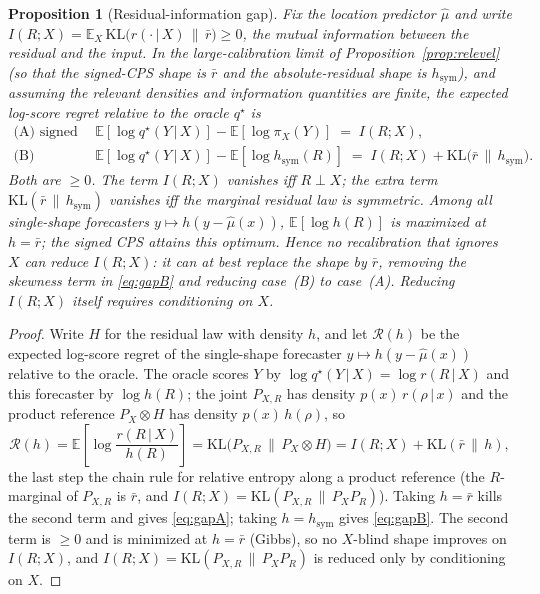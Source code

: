 \documentclass[11pt]{article}
\newtheorem{proposition}{Proposition}
\theoremstyle{definition}
\newcommand{\E}{\mathbb{E}}
\newcommand{\KL}{\mathrm{KL}}
\newcommand{\given}{\,\vert\,}
\begin{document}
\begin{proposition}[Residual-information gap]\label{prop:gap}
Fix the location predictor $\hat\mu$ and write
$I(R;X)=\E_X\,\KL\!\big(r(\cdot\given X)\,\|\,\bar r\big)\ge 0$, the mutual information
between the residual and the input. In the large-calibration limit of
Proposition~\ref{prop:relevel} (so that the signed-CPS shape is $\bar r$ and the
absolute-residual shape is $h_{\mathrm{sym}}$), and assuming the relevant densities and
information quantities are finite, the expected log-score regret relative to the oracle
$q^\star$ is
\begin{align}
  \text{(A) signed CPS:}\quad
  &\E[\log q^\star(Y\given X)]-\E[\log \pi_X(Y)] \;=\; I(R;X), \label{eq:gapA}\\[2pt]
  \text{(B) absolute intervals:}\quad
  &\E[\log q^\star(Y\given X)]-\E[\log h_{\mathrm{sym}}(R)] \;=\; I(R;X)
     +\KL\!\big(\bar r\,\|\,h_{\mathrm{sym}}\big). \label{eq:gapB}
\end{align}
Both are $\ge 0$. The term $I(R;X)$ vanishes iff $R\perp X$; the extra term
$\KL(\bar r\,\|\,h_{\mathrm{sym}})$ vanishes iff the marginal residual law is symmetric.
Among all single-shape forecasters $y\mapsto h(y-\hat\mu(x))$, $\E[\log h(R)]$ is maximized
at $h=\bar r$; the signed CPS attains this optimum. Hence no recalibration that ignores
$X$ can reduce $I(R;X)$: it can at best replace the shape by $\bar r$, removing the
skewness term in \eqref{eq:gapB} and reducing case~(B) to case~(A). Reducing $I(R;X)$
itself requires conditioning on $X$.
\end{proposition}

\begin{proof}
Write $H$ for the residual law with density $h$, and let $\mathcal{R}(h)$ be the expected log-score
regret of the single-shape forecaster $y\mapsto h(y-\hat\mu(x))$ relative to the oracle. The
oracle scores $Y$ by $\log q^\star(Y\given X)=\log r(R\given X)$ and this forecaster by
$\log h(R)$; the joint $P_{X,R}$ has density $p(x)\,r(\rho\given x)$ and the product reference
$P_X\otimes H$ has density $p(x)\,h(\rho)$, so
\begin{equation}\label{eq:master}
  \mathcal{R}(h)=\E\!\left[\log\frac{r(R\given X)}{h(R)}\right]
      =\KL\!\big(P_{X,R}\,\big\|\,P_X\otimes H\big)
      = I(R;X)+\KL(\bar r\,\|\,h),
\end{equation}
the last step the chain rule for relative entropy along a product reference (the $R$-marginal
of $P_{X,R}$ is $\bar r$, and $I(R;X)=\KL(P_{X,R}\,\|\,P_X P_R)$). Taking $h=\bar r$ kills the
second term and gives \eqref{eq:gapA}; taking $h=h_{\mathrm{sym}}$ gives \eqref{eq:gapB}. The
second term is $\ge 0$ and is minimized at $h=\bar r$ (Gibbs), so no $X$-blind shape improves
on $I(R;X)$, and $I(R;X)=\KL(P_{X,R}\,\|\,P_X P_R)$ is reduced only by conditioning on $X$.
\end{proof}
\end{document}
